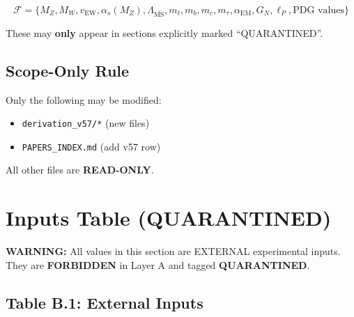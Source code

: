 \documentclass[11pt,a4paper]{article}
\theoremstyle{definition}
\begin{document}
\begin{forbiddenbox}
\begin{equation}
\label{eq:forbidden-anchors}
\mathcal{F} = \{M_Z, M_W, v_{\text{EW}}, \alpha_s(M_Z), \Lambda_{\overline{\text{MS}}},
  m_t, m_b, m_c, m_\tau, \alpha_{\text{EM}}, G_N, \ell_P, \text{PDG values}\}
\end{equation}
\end{forbiddenbox}

These may \textbf{only} appear in sections explicitly marked ``QUARANTINED''.

\subsection{Scope-Only Rule}
\label{subsec:scope-only}

\begin{trapbox}[HR-P61-SCOPE]
Only the following may be modified:
\begin{itemize}
  \item \texttt{derivation\_v57/*} (new files)
  \item \texttt{PAPERS\_INDEX.md} (add v57 row)
\end{itemize}
All other files are \textbf{READ-ONLY}.
\end{trapbox}

\section{Inputs Table (QUARANTINED)}
\label{sec:inputs}

\begin{quarantinebox}
\textbf{WARNING:} All values in this section are EXTERNAL experimental inputs.
They are \textbf{FORBIDDEN} in Layer A and tagged \textbf{QUARANTINED}.
\end{quarantinebox}

\subsection{Table B.1: External Inputs}
\label{subsec:table-b1}
\end{document}
